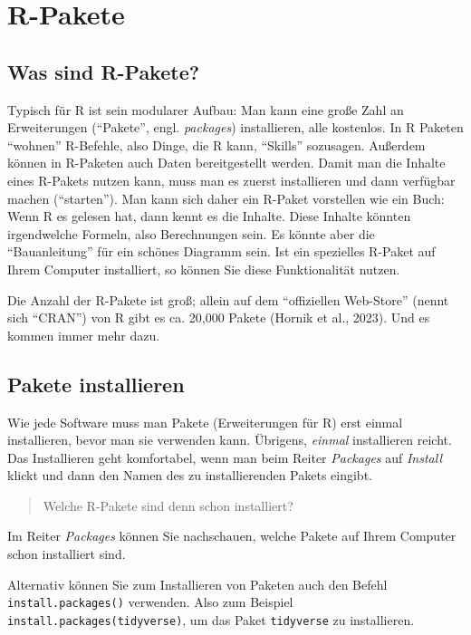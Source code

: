 \documentclass[
  letterpaper,
  oneside,
  open=any]{scrbook}
\theoremstyle{definition}
\theoremstyle{definition}
\theoremstyle{definition}
\theoremstyle{remark}
\begin{document}
\section{R-Pakete}\label{r-pakete}

\subsection{Was sind R-Pakete?}\label{was-sind-r-pakete}

Typisch für R ist sein modularer Aufbau: Man kann eine große Zahl an
Erweiterungen (\enquote{Pakete}, engl. \emph{packages}) installieren,
alle kostenlos. In R Paketen \enquote{wohnen} R-Befehle, also Dinge, die
R kann, \enquote{Skills} sozusagen. Außerdem können in R-Paketen auch
Daten bereitgestellt werden. Damit man die Inhalte eines R-Pakets nutzen
kann, muss man es zuerst installieren und dann verfügbar machen
(\enquote{starten}). Man kann sich daher ein R-Paket vorstellen wie ein
Buch: Wenn R es gelesen hat, dann kennt es die Inhalte. Diese Inhalte
könnten irgendwelche Formeln, also Berechnungen sein. Es könnte aber die
\enquote{Bauanleitung} für ein schönes Diagramm sein. Ist ein spezielles
R-Paket auf Ihrem Computer installiert, so können Sie diese
Funktionalität nutzen.

Die Anzahl der R-Pakete ist groß; allein auf dem \enquote{offiziellen
Web-Store} (nennt sich \enquote{CRAN}) von R gibt es ca. 20,000 Pakete
(Hornik et al., 2023). Und es kommen immer mehr dazu.

\subsection{Pakete installieren}\label{sec-install-r-pckgs}

Wie jede Software muss man Pakete (Erweiterungen für R) erst einmal
installieren, bevor man sie verwenden kann. Übrigens, \emph{einmal}
installieren reicht. Das Installieren geht komfortabel, wenn man beim
Reiter \emph{Packages} auf \emph{Install} klickt und dann den Namen des
zu installierenden Pakets eingibt.

\begin{quote}
{} Welche R-Pakete sind denn schon installiert?
\end{quote}

Im Reiter \emph{Packages} können Sie nachschauen, welche Pakete auf
Ihrem Computer schon installiert sind.

Alternativ können Sie zum Installieren von Paketen auch den Befehl
\texttt{install.packages()} verwenden. Also zum Beispiel
\texttt{install.packages(tidyverse)}, um das Paket \texttt{tidyverse} zu
installieren.
\end{document}
